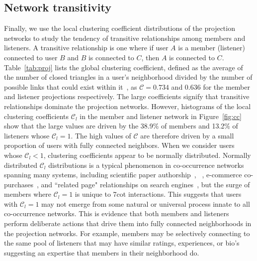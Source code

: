 \subsection{Network transitivity}
Finally, we use the local clustering coefficient distributions of the projection 
networks to study the tendency of transitive relationships among members
and listeners. A transitive relationship is one where if user $A$ is a 
member (listener) connected to user $B$ and $B$ is connected to $C$, then $A$
is connected to $C$. Table~\ref{tab:proj} lists the global clustering coefficient,
defined as the average of the number of closed triangles in a user's neighborhood 
divided by the number of possible links that could exist within 
it~\cite{watts1998collective}, as $\mathcal{C} = 0.734$ and $0.636$
for the member and listener projections respectively. The large  
coefficients signify that transitive relationships dominate the projection
networks. However, histograms of the local clustering coefficients $\mathcal{C}_l$ in the
member and listener network in Figure~\ref{fig:cc} show that the large values are driven 
by the 38.9\% of members and 13.2\% of listeners whose $\mathcal{C}_l = 1$. The high values
of $\mathcal{C}$ are therefore driven by a small proportion of users with fully
connected neighbors. 
When we consider users whose $\mathcal{C}_l < 1$, 
clustering coefficients appear to be normally distributed.  
Normally distributed $\mathcal{C}_l$ distributions is a typical phenomenon in co-occurrence
networks spanning many systems, including scientific paper authorship~\cite{yang2015defining}, ~\cite{leskovec2007graph}, e-commerce co-purchases~\cite{leskovec2007dynamics}, and ``related page" relationships on search engines~\cite{niu2011zhishi}, but the surge of members where $\mathcal{C}_l = 1$ is 
unique to 7cot interactions. 
This suggests that users with $\mathcal{C}_l = 1$ may not emerge from some natural or 
universal process innate to all co-occurrence networks. This is evidence that 
both members and listeners perform deliberate actions that drive them into fully connected 
neighborhoods in the projection networks. For example, members may be selectively
connecting to the same pool of listeners that may have similar ratings, 
experiences, or bio's suggesting an expertise that members in their neighborhood do.



